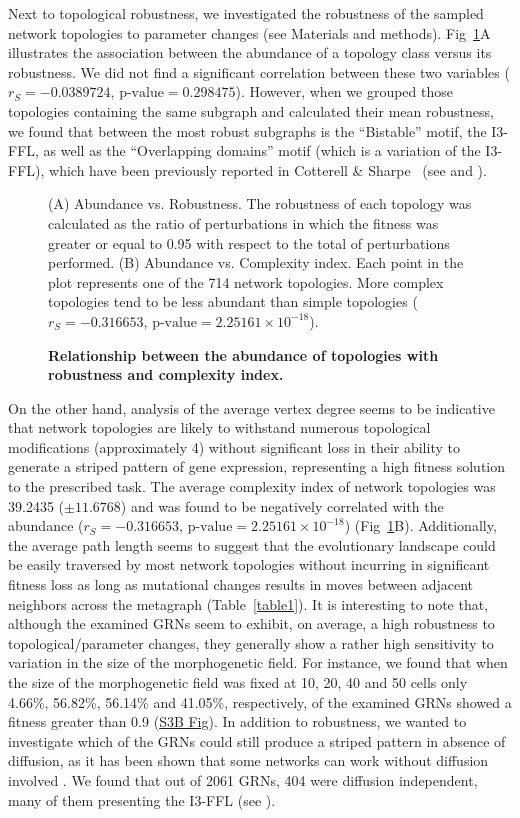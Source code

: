 \documentclass[10pt,letterpaper]{article}
\begin{document}
Next to topological robustness, we investigated the robustness of the sampled
network topologies to parameter changes (see Materials and methods).
Fig~\ref{fig:ab-rob}A illustrates the association
between the abundance of a topology class versus its
robustness. We did not find a significant correlation between
these two variables ($r_S = −0.0389724$, $\text{p-value} = 0.298475$).
However, when we grouped those topologies containing
the same subgraph and calculated their mean robustness, we found that between
the most robust subgraphs is the ``Bistable'' motif, the I3-FFL, as well as
the ``Overlapping domains'' motif (which is a variation of the I3-FFL), which
have been previously reported in Cotterell \& Sharpe~\cite{Cotterell2010}
(see  and ).

\begin{figure}[!h]
 \caption{\bf Relationship between the abundance of topologies with
 robustness and complexity index.}
 (A) Abundance vs. Robustness. The robustness of each topology was
 calculated as the ratio of perturbations in which the fitness was greater or
 equal to 0.95 with respect to the total of perturbations performed.
 (B) Abundance vs. Complexity index. Each point in the plot represents one of
 the 714 network topologies. More complex topologies tend to be less abundant
 than simple topologies
 ($r_S = -0.316653$, $\text{p-value} = 2.25161\times10^{-18}$).
 \label{fig:ab-rob}
\end{figure}

On the other hand, analysis of the average vertex degree seems to be indicative
that network topologies are likely to withstand numerous topological
modifications (approximately 4) without significant loss in their ability to
generate a striped pattern of gene expression, representing a high fitness
solution to the prescribed task. The average complexity index of network
topologies was 39.2435 ($\pm 11.6768$) and was found to be negatively
correlated with the abundance ($r_S = -0.316653$, $\text{p-value} =
2.25161\times10^{-18}$) (Fig~\ref{fig:ab-rob}B).
Additionally, the average path length seems
to suggest that the evolutionary landscape could be easily traversed by
most network topologies without incurring in significant fitness loss as long
as mutational changes results in moves between adjacent neighbors across
the metagraph (Table~\ref{table1}). It is interesting to note that,
although the examined GRNs seem to exhibit, on average, a high robustness to
topological/parameter changes, they generally show a rather high sensitivity to
variation in the size of the morphogenetic field. For instance, we found that
when the size of the morphogenetic field was fixed at 10, 20, 40 and 50 cells
only 4.66\%, 56.82\%, 56.14\% and 41.05\%, respectively, of the examined
GRNs showed a fitness greater than 0.9 (\hyperref[S3_Fig]{S3B Fig}). In addition to
robustness, we wanted to investigate which of the GRNs could still produce
a striped pattern in absence of diffusion, as it has been shown that some
networks can work without diffusion involved \cite{Schaerli2018}. We found
that out of 2061 GRNs, 404 were diffusion independent, many of them
presenting the I3-FFL (see ).
\end{document}
